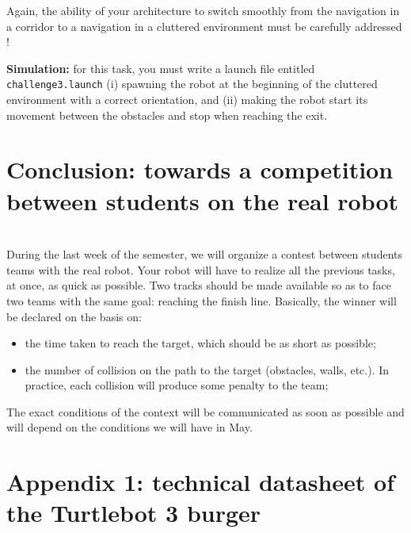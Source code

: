 \documentclass[10pt,a4paper,printanswers]{upmc}
\newcommand{\myline}{\noindent\makebox[\linewidth]{\rule{\textwidth}{0.7pt}}}
\begin{document}
Again, the ability of your architecture to switch smoothly from the navigation in a corridor to a
navigation in a cluttered environment must be carefully addressed !

\begin{mdframed}[style=evaluation]
  \textbf{Simulation:} for this task, you must write a launch file entitled
  \texttt{challenge3.launch} (i) spawning the robot at the beginning of the cluttered environment
  with a correct orientation, and (ii) making the robot start its movement between the obstacles and
  stop when reaching the exit.
\end{mdframed}

\section{Conclusion: towards a competition between students on the real robot}
\vspace{-0.5cm}\myline\\

During the last week of the semester, we will organize a contest between students teams with the
real robot. Your robot will have to realize all the previous tasks, at once, as quick as possible.
Two tracks should be made available so as to face two teams with the same goal: reaching the
finish line. Basically, the winner will be declared on the basis on:
\begin{itemize}
  \item the time taken to reach the target, which should be as short as possible;
  \item the number of collision on the path to the target (obstacles, walls, etc.). In practice,
        each collision will produce some penalty to the team;
\end{itemize}

The exact conditions of the context will be communicated as soon as possible and will depend on the
conditions we will have in May.

\section{Appendix 1: technical datasheet of the Turtlebot 3 burger}
\vspace{-0.5cm}\myline\\
\end{document}

